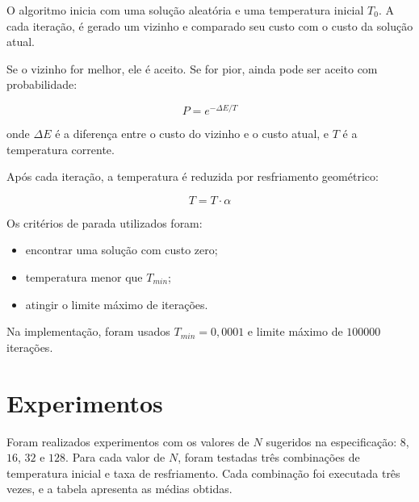 \documentclass[12pt,a4paper]{article}
\begin{document}
O algoritmo inicia com uma solução aleatória e uma temperatura inicial $T_0$. A cada iteração, é gerado um vizinho e comparado seu custo com o custo da solução atual.

Se o vizinho for melhor, ele é aceito. Se for pior, ainda pode ser aceito com probabilidade:

\[
P = e^{-\Delta E / T}
\]

onde $\Delta E$ é a diferença entre o custo do vizinho e o custo atual, e $T$ é a temperatura corrente.

Após cada iteração, a temperatura é reduzida por resfriamento geométrico:

\[
T = T \cdot \alpha
\]

Os critérios de parada utilizados foram:

\begin{itemize}
    \item encontrar uma solução com custo zero;
    \item temperatura menor que $T_{min}$;
    \item atingir o limite máximo de iterações.
\end{itemize}

Na implementação, foram usados $T_{min} = 0{,}0001$ e limite máximo de $100000$ iterações.

\section{Experimentos}

Foram realizados experimentos com os valores de $N$ sugeridos na especificação: $8$, $16$, $32$ e $128$. Para cada valor de $N$, foram testadas três combinações de temperatura inicial e taxa de resfriamento. Cada combinação foi executada três vezes, e a tabela apresenta as médias obtidas.
\end{document}
